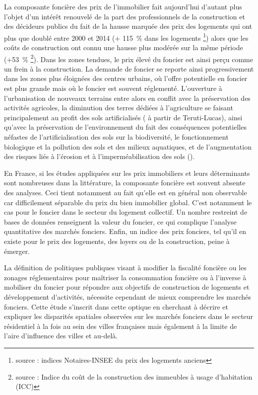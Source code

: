 \documentclass[10.5pt,a4paper]{article}
\begin{document}
{La composante foncière des prix de l'immobilier fait aujourd'hui d'autant plus l'objet d'un intérêt renouvelé de la part des professionnels de la construction et des décideurs publics du fait de la hausse marquée des prix des logements qui ont plus que doublé entre 2000 et 2014 (+ 115~\% dans les logements \footnote{source :  indices Notaires-INSEE du prix des logements anciens}) alors que les coûts de construction ont connu une hausse plus modérée sur la même période (+53~\% \footnote{source : Indice du coût de la construction des immeubles à usage d'habitation (ICC)}). Dans les zones tendues, le prix élevé du foncier %
est ainsi perçu comme un frein à la construction. La demande de foncier se reporte ainsi progressivement dans les zones plus éloignées des centres urbains, où l'offre potentielle en foncier est plus grande mais où le foncier est souvent réglementé. L'ouverture à l'urbanisation de nouveaux terrains entre alors en conflit avec la préservation des activités agricoles, la diminution des terres dédiées à l’agriculture se faisant principalement au profit des sols artificialisés (\cite{Vermont14} à partir de Teruti-Lucas), ainsi qu'avec la préservation de l'environnement du fait des conséquences potentielles néfastes de l'artificialisation des sols sur la biodiversité,  le fonctionnement biologique et la pollution des sols et des milieux aquatiques, et de l'augmentation des risques liés à l'érosion et à l'imperméabilisation des sols (\cite{RapportEtatEnvir2014}). \par


En France, si les études appliquées sur les prix immobiliers et leurs déterminants sont nombreuses dans la littérature, la composante foncière est souvent absente des analyses. Ceci tient notamment au fait qu'elle est en général non observable car difficilement séparable du prix du bien immobilier global. C'est notamment le cas pour le foncier dans le secteur du logement collectif. Un nombre restreint de bases de données renseignent la valeur du foncier, ce qui complique l'analyse quantitative des marchés fonciers. Enfin, un indice des prix fonciers, tel qu'il en existe pour le prix des logements, des loyers ou de la construction, peine à émerger. \par

La définition de politiques publiques visant à modifier la fiscalité foncière ou les zonages réglementaires pour maîtriser la consommation  foncière ou à l'inverse à mobiliser du foncier pour répondre aux objectifs de construction de logements et développement d'activités, nécessite cependant de mieux comprendre les marchés fonciers. Cette étude s'inscrit dans cette optique en cherchant à décrire et expliquer les disparités spatiales observées sur les marchés fonciers dans le secteur résidentiel à la fois au sein des villes françaises mais également à la limite de l'aire d'influence des villes et au-delà. \par

}
\end{document}
